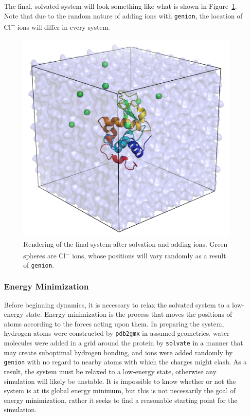 \documentclass[9pt,tutorial,pubversion]{livecoms}
\begin{document}
The final, solvated system will look something like what is shown in Figure~\ref{lyso_solv_ions_fig}. Note that due to the random nature of adding ions with \texttt{genion}, the location of Cl\textsuperscript{$-$} ions will differ in every system.

\begin{figure}[h]
\centering
\includegraphics{1AKI_solv_ions}
\caption{Rendering of the final system after solvation and adding ions. Green spheres are Cl\textsuperscript{$-$} ions, whose positions will vary randomly as a result of \texttt{genion}.}
\label{lyso_solv_ions_fig}
\end{figure}

\subsubsection{Energy Minimization} \label{lyso_em}

Before beginning dynamics, it is necessary to relax the solvated system to a low-energy state. Energy minimization is the process that moves the positions of atoms according to the forces acting upon them. In preparing the system, hydrogen atoms were constructed by \texttt{pdb2gmx} in assumed geometries, water molecules were added in a grid around the protein by \texttt{solvate} in a manner that may create suboptimal hydrogen bonding, and ions were added randomly by \texttt{genion} with no regard to nearby atoms with which the charges might clash. As a result, the system must be relaxed to a low-energy state, otherwise any simulation will likely be unstable. It is impossible to know whether or not the system is at its global energy minimum, but this is not necessarily the goal of energy minimization, rather it seeks to find a reasonable starting point for the simulation.
\end{document}
